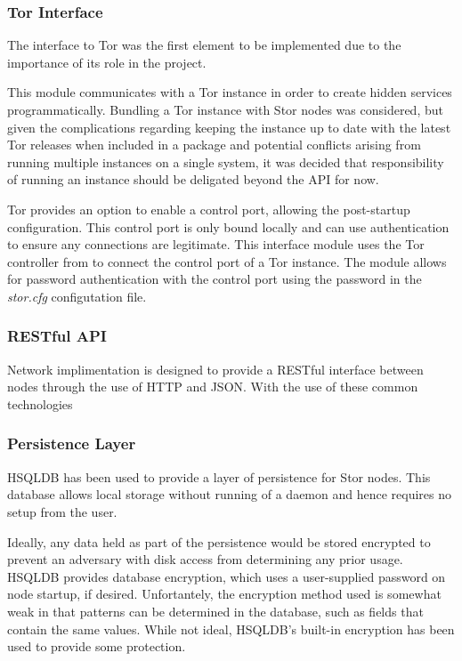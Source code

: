 		\subsubsection*{Tor Interface}
			The interface to Tor was the first element to be implemented  due to the importance of its role in the project.
			
			This module communicates with a Tor instance in order to create hidden services programmatically. Bundling a Tor instance with Stor nodes was considered, but given the complications regarding keeping the instance up to date with the latest Tor releases when included in a package and potential conflicts arising from running multiple instances on a single system, it was decided that responsibility of running an instance should be deligated beyond the API for now.
			
			Tor provides an option to enable a control port, allowing the post-startup configuration. This control port is only bound locally and can use authentication to ensure any connections are legitimate. This interface module uses the Tor controller from  to connect the control port of a Tor instance. The module allows for password authentication with the control port using the password in the \textit{stor.cfg} configutation file. 
		\subsubsection*{RESTful API}
			Network implimentation is designed to provide a RESTful interface between nodes through the use of HTTP and JSON. With the use of these common technologies
		\subsubsection*{Persistence Layer}
			HSQLDB has been used to provide a layer of persistence for Stor nodes. This database allows local storage without running of a daemon and hence requires no setup from the user.
			
			Ideally, any data held as part of the persistence would be stored encrypted to prevent an adversary with disk access from determining any prior usage. HSQLDB provides database encryption, which uses a user-supplied password on node startup, if desired. Unfortantely, the encryption method used is somewhat weak in that patterns can be determined in the database, such as fields that contain the same values. While not ideal, HSQLDB's built-in encryption has been used to provide some protection.
			
